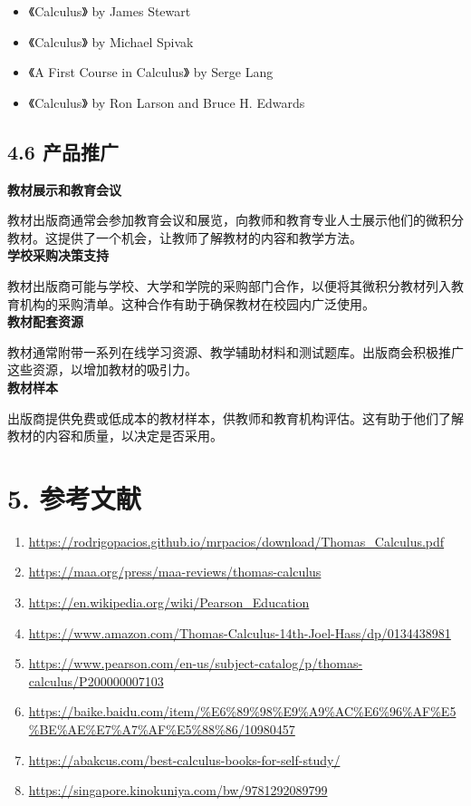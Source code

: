 \documentclass{report}
\begin{document}
\begin{itemize}
    \item《Calculus》 by James Stewart

    \item 《Calculus》 by Michael Spivak

    \item 《A First Course in Calculus》 by Serge Lang

          \item《Calculus》 by Ron Larson and Bruce H. Edwards
\end{itemize}

\subsection*{4.6 产品推广}

\noindent\textbf{教材展示和教育会议}

\noindent 教材出版商通常会参加教育会议和展览，向教师和教育专业人士展示他们的微积分教材。这提供了一个机会，让教师了解教材的内容和教学方法。
~\\

\noindent\textbf{学校采购决策支持}

\noindent 教材出版商可能与学校、大学和学院的采购部门合作，以便将其微积分教材列入教育机构的采购清单。这种合作有助于确保教材在校园内广泛使用。
~\\

\noindent\textbf{教材配套资源}

\noindent 教材通常附带一系列在线学习资源、教学辅助材料和测试题库。出版商会积极推广这些资源，以增加教材的吸引力。
~\\

\noindent\textbf{教材样本}

\noindent 出版商提供免费或低成本的教材样本，供教师和教育机构评估。这有助于他们了解教材的内容和质量，以决定是否采用。
~\\

\section*{5. 参考文献}

\begin{enumerate}
    \item \url{https://rodrigopacios.github.io/mrpacios/download/Thomas_Calculus.pdf}
    \item \url{https://maa.org/press/maa-reviews/thomas-calculus}
    \item \url{https://en.wikipedia.org/wiki/Pearson_Education}
    \item \url{https://www.amazon.com/Thomas-Calculus-14th-Joel-Hass/dp/0134438981}
    \item \url{https://www.pearson.com/en-us/subject-catalog/p/thomas-calculus/P200000007103}
    \item \url{https://baike.baidu.com/item/%E6%89%98%E9%A9%AC%E6%96%AF%E5%BE%AE%E7%A7%AF%E5%88%86/10980457}
    \item \url{https://abakcus.com/best-calculus-books-for-self-study/}
    \item \url{https://singapore.kinokuniya.com/bw/9781292089799}
\end{enumerate}
\end{document}
